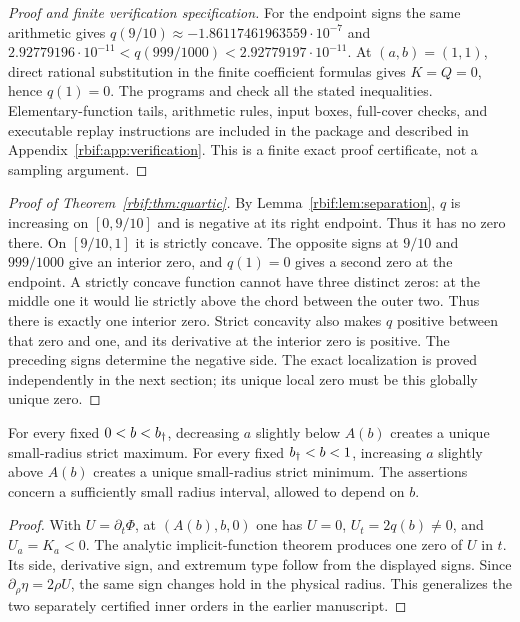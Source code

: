 \begin{proof}[Proof and finite verification specification]
For the endpoint signs the same arithmetic gives
$q(9/10)\approx-1.86117461963559\cdot10^{-7}$ and
$2.92779196\cdot10^{-11}<q(999/1000)<2.92779197\cdot10^{-11}$.
At $(a,b)=(1,1)$, direct rational substitution in the finite coefficient
formulas gives $K=Q=0$, hence $q(1)=0$.
The programs  and  check
all the stated inequalities. Elementary-function tails, arithmetic rules,
input boxes, full-cover checks, and executable replay instructions are
included in the package and described in
Appendix~\ref{rbif:app:verification}. This is a finite exact proof
certificate, not a sampling argument.
\end{proof}

\begin{proof}[Proof of Theorem~\ref{rbif:thm:quartic}]
By Lemma~\ref{rbif:lem:separation}, $q$ is increasing on $[0,9/10]$
and is negative at its right endpoint. Thus it has no zero there.
On $[9/10,1]$ it is strictly concave. The opposite signs at $9/10$
and $999/1000$ give an interior zero, and $q(1)=0$ gives a second zero
at the endpoint. A strictly concave function cannot have three distinct
zeros: at the middle one it would lie strictly above the chord between
the outer two. Thus there is exactly one interior zero. Strict concavity
also makes $q$ positive between that zero and one, and its derivative at
the interior zero is positive. The preceding signs determine the negative
side. The exact localization is proved independently in the next section;
its unique local zero must be this globally unique zero.
\end{proof}

\begin{corollary}
\label{rbif:cor:localfamily}
For every fixed $0<b<b_\dagger$, decreasing $a$ slightly below $A(b)$
creates a unique small-radius strict maximum. For every fixed
$b_\dagger<b<1$, increasing $a$ slightly above $A(b)$ creates a unique
small-radius strict minimum. The assertions concern a sufficiently small
radius interval, allowed to depend on $b$.
\end{corollary}
\begin{proof}
With $U=\partial_t\Phi$, at $(A(b),b,0)$ one has
$U=0$, $U_t=2q(b)\ne0$, and $U_a=K_a<0$.
The analytic implicit-function theorem produces one zero of $U$ in $t$.
Its side, derivative sign, and extremum type follow from the displayed
signs. Since $\partial_\rho\eta=2\rho U$, the same sign changes hold
in the physical radius. This generalizes the two separately certified
inner orders in the earlier manuscript.
\end{proof}

